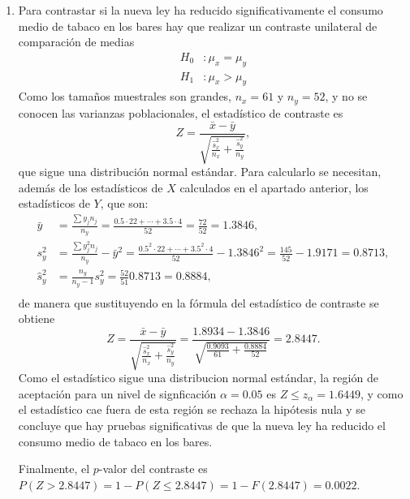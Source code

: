 {\begin{enumerate}
\item Para contrastar si la nueva ley ha reducido significativamente el consumo medio de tabaco en los bares hay que realizar un contraste unilateral de comparación de medias
\begin{align*}
H_0 &: \mu_x = \mu_y\\
H_1 &: \mu_x > \mu_y
\end{align*}
Como los tamaños muestrales son grandes, $n_x=61$ y $n_y=52$, y no se conocen las varianzas poblacionales, el estadístico de contraste es 
\[
Z = \frac{\bar x -\bar y}{\sqrt{\frac{\hat s_x^2}{n_x}+\frac{\hat s_y^2}{n_y}}},
\]
que sigue una distribución normal estándar.
Para calcularlo se necesitan, además de los estadísticos de $X$ calculados en el apartado anterior, los estadísticos de $Y$, que son:
\begin{align*}
\bar y &= \frac{\sum y_jn_j}{n_y} = \frac{0.5\cdot22+\cdots+3.5\cdot4}{52} = \frac{72}{52} = 1.3846,\\
s_y^2 & = \frac{\sum y_j^2n_j}{n_y}-\bar y^2 = \frac{0.5^2\cdot22+\cdots+3.5^2\cdot4}{52} -1.3846^2= \frac{145}{52}-1.9171 = 0.8713,\\
\hat s_y^2 &= \frac{n_y}{n_y-1}s_y^2 = \frac{52}{51}0.8713 = 0.8884,\\
\end{align*}
de manera que sustituyendo en la fórmula del estadístico de contraste se obtiene
\[
Z = \frac{\bar x -\bar y}{\sqrt{\frac{\hat s_x^2}{n_x}+\frac{\hat s_y^2}{n_y}}} 
= \frac{1.8934-1.3846}{\sqrt{\frac{0.9093}{61}+\frac{0.8884}{52}}} = 2.8447.
\]
Como el estadístico sigue una distribucion normal estándar, la región de aceptación para un nivel de signficación $\alpha=0.05$ es $Z\leq z_\alpha=1.6449$, y como el estadístico cae fuera de esta región se rechaza la hipótesis nula y se concluye que hay pruebas significativas de que la nueva ley ha reducido el consumo medio de tabaco en los bares.

Finalmente, el $p$-valor del contraste es $P(Z>2.8447)= 1- P(Z\leq 2.8447) = 1 - F(2.8447) = 0.0022$.
\end{enumerate}
}


